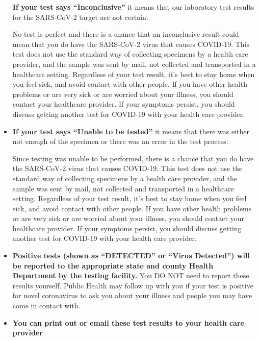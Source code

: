 \documentclass[12pt]{article}
\begin{document}
\begin{itemize}
  \textbf{If your test says ``Inconclusive''} it means that our
  laboratory test results for the SARS-CoV-2 target are not certain.

  No test is perfect and there is a chance that an inconclusive result
  could mean that you do have the SARS-CoV-2 virus that causes COVID-19.
  This test does not use the standard way of collecting specimens by a
  health care provider, and the sample was sent by mail, not collected and
  transported in a healthcare setting. Regardless of your test result,
  it's best to stay home when you feel sick, and avoid contact with other
  people. If you have other health problems or are very sick or are
  worried about your illness, you should contact your healthcare provider.
  If your symptoms persist, you should discuss getting another test for
  COVID-19 with your health care provider.

\item

  \textbf{If your test says ``Unable to be tested''} it means that there
  was either not enough of the specimen or there was an error in the
  test process.

  Since testing was unable to be performed, there is a chance that you do
  have the SARS-CoV-2 virus that causes COVID-19. This test does not use
  the standard way of collecting specimens by a health care provider, and
  the sample was sent by mail, not collected and transported in a
  healthcare setting. Regardless of your test result, it's best to stay
  home when you feel sick, and avoid contact with other people. If you
  have other health problems or are very sick or are worried about your
  illness, you should contact your healthcare provider. If your symptoms
  persist, you should discuss getting another test for COVID-19 with your
  health care provider.

\end{itemize}

\begin{itemize}
\item

  \textbf{Positive tests (shown as ``DETECTED'' or ``Virus Detected'')
  will be reported to the appropriate state and county Health Department
  by the testing facility.} You DO NOT need to report these results
  yourself. Public Health may follow up with you if your test is
  positive for novel coronavirus to ask you about your illness and
  people you may have come in contact with.

\item

  \textbf{You can print out or email these test results to your health
  care provider}

\end{itemize}
\end{document}

